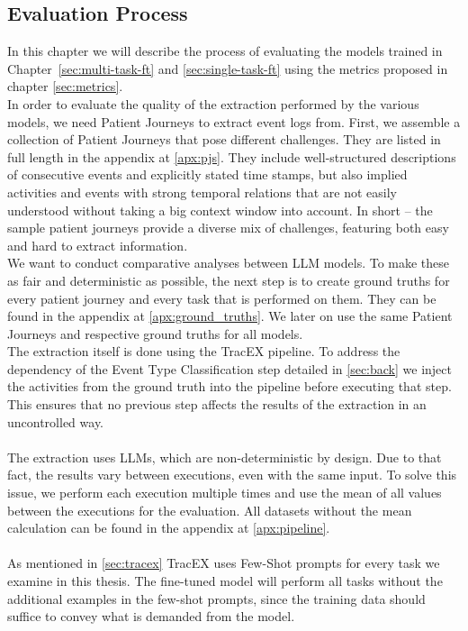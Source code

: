 \subsection{Evaluation Process}\label{sec:eval_process}
In this chapter we will describe the process of evaluating the models trained in Chapter~\ref{sec:multi-task-ft} and \ref{sec:single-task-ft} using the metrics proposed in chapter \ref{sec:metrics}.\\
In order to evaluate the quality of the extraction performed by the various models, we need Patient Journeys to extract event logs from. First, we assemble a collection of Patient Journeys that pose different challenges. They are listed in full length in the appendix at \ref{apx:pjs}. They include well-structured descriptions of consecutive events and explicitly stated time stamps, but also implied activities and events with strong temporal relations that are not easily understood without taking a big context window into account. In short – the sample patient journeys provide a diverse mix of challenges, featuring both easy and hard to extract information.\\
We want to conduct comparative analyses between LLM models. To make these as fair and deterministic as possible, the next step is to create ground truths for every patient journey and every task that is performed on them. They can be found in the appendix at \ref{apx:ground_truths}. We later on use the same Patient Journeys and respective ground truths for all models.\\
The extraction itself is done using the TracEX pipeline. To address the dependency of the Event Type Classification step detailed in \ref{sec:back} we inject the activities from the ground truth into the pipeline before executing that step. This ensures that no previous step affects the results of the extraction in an uncontrolled way.\\\\
The extraction uses LLMs, which are non-deterministic by design. Due to that fact, the results vary between executions, even with the same input. To solve this issue, we perform each execution multiple times and use the mean of all values between the executions for the evaluation. All datasets without the mean calculation can be found in the appendix at \autoref{apx:pipeline}.\\\\
As mentioned in \autoref{sec:tracex} TracEX uses Few-Shot prompts for every task we examine in this thesis. The fine-tuned model will perform all tasks without the additional examples in the few-shot prompts, since the training data should suffice to convey what is demanded from the model.

